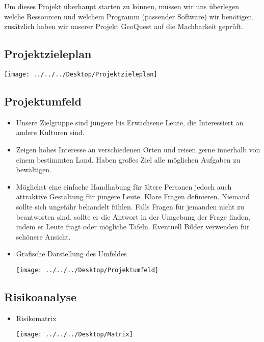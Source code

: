 Um dieses Projekt überhaupt starten zu können, müssen wir uns überlegen welche Ressourcen und welchem Programm (passender Software) wir benötigen, zusätzlich haben wir unserer Projekt GeoQuest auf die Machbarkeit geprüft.

\subsection{Projektzieleplan}
\begin{center}
	\texttt{[image: ../../../Desktop/Projektzieleplan]}
\end{center}

\subsection{Projektumfeld}
\begin{itemize}
	\item Unsere Zielgruppe sind jüngere bis Erwachsene Leute, die Interessiert an andere Kulturen sind.
	\item Zeigen hohes Interesse an verschiedenen Orten und reisen gerne innerhalb von einem bestimmten Land. Haben großes Ziel alle möglichen Aufgaben zu bewältigen.
	\item Möglichst eine einfache Handhabung für ältere Personen jedoch auch attraktive Gestaltung für jüngere Leute. Klare Fragen definieren. Niemand sollte sich ungefähr behandelt fühlen. Falls Fragen für jemanden nicht zu beantworten sind, sollte er die Antwort in der Umgebung der Frage finden, indem er Leute fragt oder mögliche Tafeln. Eventuell Bilder verwenden für schönere Ansicht.
	\item Grafische Darstellung des Umfeldes
\begin{center}
	\texttt{[image: ../../../Desktop/Projektumfeld]}
\end{center}

	
\end{itemize}
\subsection{Risikoanalyse}
\begin{itemize}
	\item Risikomatrix
	\begin{center}
		\texttt{[image: ../../../Desktop/Matrix]}
	\end{center}
	
\end{itemize}
